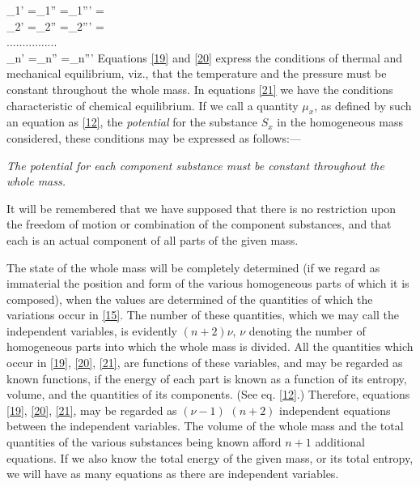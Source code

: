 \documentclass[12pt]{article}
\begin{document}
\eqs \mu_1' =\mu_1'' =\mu_1''' =\\
\mu_2' =\mu_2'' =\mu_2''' =  \\
................\\
\mu_n' =\mu_n'' =\mu_n''' \label{21}\eqe
Equations \ref{19} and \ref{20} express the conditions of thermal and mechanical equilibrium, viz., that the temperature and the pressure must be constant throughout the whole mass. In equations \ref{21} we have the conditions characteristic of chemical equilibrium. If we call a quantity $\mu_x$, as defined by such an equation as \ref{12}, the \textit{potential} for the substance $S_x$ in the homogeneous mass considered, these conditions may be expressed as follows:---

\textit{The potential for each component substance must be constant throughout the whole mass.}

It will be remembered that we have supposed that there is no restriction upon the freedom of motion or combination of the component substances, and that each is an actual component of all parts of the given mass.

The state of the whole mass will be completely determined (if we regard as immaterial the position and form of the various homogeneous parts of which it is composed), when the values are determined of the quantities of which the variations occur in \ref{15}. The number of these quantities, which we may call the independent variables, is evidently $(n+2)\nu$, $\nu$ denoting the number of homogeneous parts into which the whole mass is divided. All the quantities which occur in \ref{19}, \ref{20}, \ref{21}, are functions of these variables, and may be regarded as known functions, if the energy of each part is known as a function of its entropy, volume, and the quantities of its components. (See eq. \ref{12}.) Therefore, equations \ref{19}, \ref{20}, \ref{21}, may be regarded as $(\nu-1)$ $(n+2)$ independent equations between the independent variables. The volume of the whole mass and the total quantities of the various substances being known afford $ n + 1$ additional equations. If we also know the total energy of the given mass, or its total entropy, we will have as many equations as there are independent variables.
\end{document}
